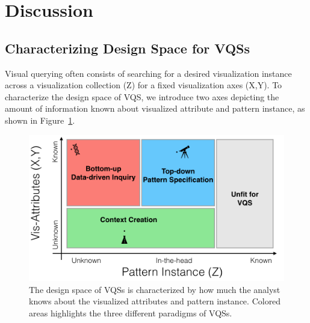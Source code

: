 \section{Discussion\label{sec:guidelines}}
\subsection{Characterizing Design Space for VQSs}
Visual querying often consists of searching for a desired visualization instance across a visualization collection (Z) for a fixed visualization axes (X,Y). To characterize the design space of VQS, we introduce two axes depicting the amount of information known about visualized attribute and pattern instance, as shown in Figure~\ref{2dmodel}.
\begin{figure}[h!]
  \centering
  \includegraphics[width=\linewidth]{figures/2dmodel.png}
  \caption{The design space of VQSs is characterized by how much the analyst knows about the visualized attributes and pattern instance. Colored areas highlights the three different paradigms of VQSs.}
  \label{2dmodel}
\end{figure}

